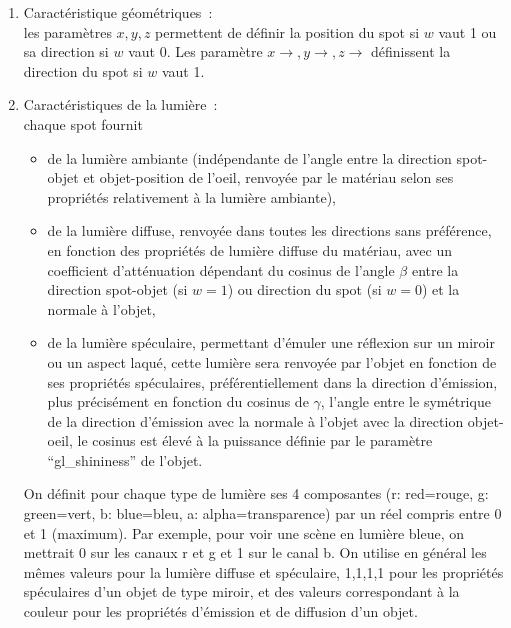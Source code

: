 \documentclass[a4paper,11pt]{article}
\begin{document}
\begin{enumerate}
\item Caract\'eristique g\'eom\'etriques~:\\ 
les param\`etres $x,y,z$ permettent
de d\'efinir la position du spot si $w$ vaut 1 ou sa direction si $w$
vaut 0.
Les param\`etre $x\rightarrow, y\rightarrow, z\rightarrow$ d\'efinissent
la direction du spot si $w$ vaut 1.

\item
Caract\'eristiques de la lumi\`ere~:\\
chaque spot fournit
\begin{itemize}
\item  de la lumi\`ere
ambiante (ind\'ependante de l'angle entre la direction spot-objet et
objet-position de l'oeil, renvoy\'ee par le mat\'eriau selon ses
propri\'et\'es relativement \`a la lumi\`ere ambiante), 
\item de la lumi\`ere diffuse, renvoy\'ee dans toutes les directions
sans pr\'ef\'erence, en fonction des
propri\'et\'es de lumi\`ere diffuse du mat\'eriau, avec un
coefficient d'att\'enuation d\'ependant du cosinus de l'angle 
$\beta$ entre la direction spot-objet (si $w=1$) ou
direction du spot (si $w=0$) et la normale \`a l'objet,
\item de la lumi\`ere sp\'eculaire, permettant
d'\'emuler une r\'eflexion sur un miroir ou un aspect laqu\'e, 
cette lumi\`ere sera renvoy\'ee 
par l'objet en fonction de ses propri\'et\'es sp\'eculaires,
pr\'ef\'erentiellement dans la direction d'\'emission, plus pr\'ecis\'ement
en fonction du cosinus de $\gamma$, 
l'angle entre le sym\'etrique de la direction d'\'emission avec la normale
\`a l'objet avec la direction
objet-oeil, le cosinus est \'elev\'e \`a la puissance d\'efinie par le param\`etre 
``gl\_shininess'' de l'objet. 
\end{itemize}
On d\'efinit pour chaque type de lumi\`ere ses 4 composantes (r: red=rouge, g:
green=vert, b: blue=bleu, a: alpha=transparence) par un r\'eel compris
entre 0 et 1 (maximum). Par exemple, pour voir une sc\`ene en lumi\`ere
bleue, on mettrait 0 sur les canaux r et g et 1 sur le canal b.
On utilise en g\'en\'eral les m\^emes valeurs pour la lumi\`ere diffuse et
sp\'eculaire, 1,1,1,1 pour les propri\'et\'es sp\'eculaires d'un
objet de type miroir, et des valeurs correspondant \`a la couleur
pour les propri\'et\'es d'\'emission et de diffusion d'un objet.


\end{enumerate}
\end{document}

